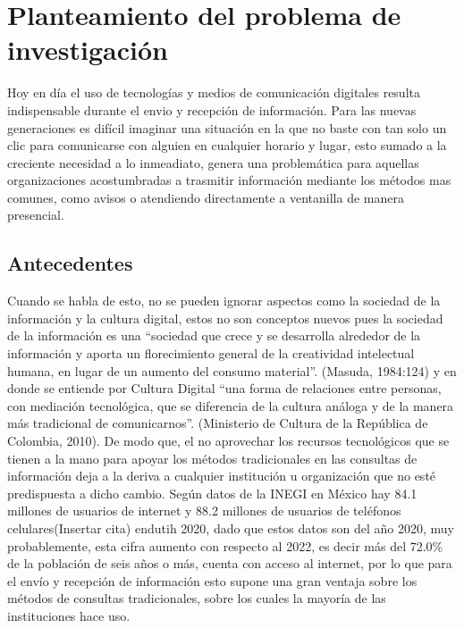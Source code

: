 \chapter{Planteamiento del problema de investigación}

Hoy en día el uso de tecnologías y medios de comunicación digitales resulta indispensable durante el envio y recepción de información. Para las nuevas generaciones es difícil imaginar una situación en la que no baste con tan solo un clic para comunicarse con alguien en cualquier horario y lugar, esto sumado a la creciente necesidad a lo inmeadiato, genera una problemática para aquellas organizaciones acostumbradas a trasmitir información mediante los métodos mas comunes, como avisos o atendiendo directamente a ventanilla de manera presencial. 

\section{Antecedentes}

Cuando se habla de esto, no se pueden ignorar aspectos como la sociedad de la información y la cultura digital, estos no son conceptos nuevos pues la sociedad de la información es una “sociedad que crece y se desarrolla alrededor de la información y aporta un florecimiento general de la creatividad intelectual humana, en lugar de un aumento del consumo material”\citep[págs. 124]{bib1}. (Masuda, 1984:124) y en donde se entiende por Cultura Digital “una forma de relaciones entre personas, con mediación tecnológica, que se diferencia de la cultura análoga y de la manera más tradicional de comunicarnos”. (Ministerio de Cultura de la República de Colombia, 2010).
De modo que, el no aprovechar los recursos tecnológicos que se tienen a la mano para apoyar los métodos tradicionales en las consultas de información deja a la deriva a cualquier institución u organización que no esté predispuesta a dicho cambio.
Según datos de la INEGI en México hay 84.1 millones de usuarios de internet y 88.2 millones de usuarios de teléfonos celulares(Insertar cita) endutih 2020, dado que estos datos son del año 2020, muy probablemente, esta cifra aumento con respecto al 2022, es decir más del 72.0\% de la población de seis años o más, cuenta con acceso al internet, por lo que para el envío y recepción de información esto supone una gran ventaja sobre los métodos de consultas tradicionales, sobre los cuales la mayoría de las instituciones hace uso.
